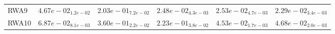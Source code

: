 \documentclass{article}
\begin{document}
\begin{table}
\begin{scriptsize}
\begin{tabular}{llllll}
RWA9 & $  4.67e-02_{ 1.2e-02}$ & $  2.03e-01_{ 7.2e-02}$ & \cellcolor{gray25}$  2.48e-02_{ 4.3e-03}$ & $  2.53e-02_{ 4.7e-03}$ & \cellcolor{gray95}$  2.29e-02_{ 3.4e-03}$ \\
RWA10 & $  6.87e-02_{ 8.1e-03}$ & $  3.60e-01_{ 2.2e-02}$ & $  2.23e-01_{ 3.8e-02}$ & \cellcolor{gray95}$  4.53e-02_{ 1.7e-03}$ & \cellcolor{gray25}$  4.68e-02_{ 2.0e-03}$ \\
\hline
\end{tabular}
\end{scriptsize}
\end{table}
\end{document}
